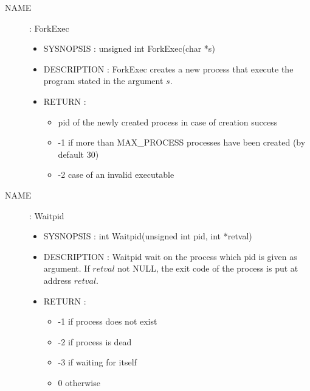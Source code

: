 \documentclass[a4paper,10pt]{article}
\begin{document}
\begin{description}
    \item [NAME] : ForkExec
        \begin{itemize}
            \item SYSNOPSIS : unsigned int ForkExec(char *s)
            \item DESCRIPTION :
                ForkExec creates a new process that execute the program stated in the argument $s$.
            \item RETURN :
                \begin{itemize}
                    \item pid of the newly created process in case of creation success
                    \item -1 if more than MAX\_PROCESS processes have been created (by default 30)
                    \item -2 case of an invalid executable
                \end{itemize}
        \end{itemize}

    \item [NAME] : Waitpid
        \begin{itemize}
            \item SYSNOPSIS : int Waitpid(unsigned int pid, int *retval)
            \item DESCRIPTION :
                Waitpid wait on the process which pid is given as argument.
                If $retval$ not NULL, the exit code of the process is put at address $retval$.
            \item RETURN :
                \begin{itemize}
                    \item -1 if process does not exist
                    \item -2 if process is dead
                    \item -3 if waiting for itself
                    \item 0 otherwise
                \end{itemize}
        \end{itemize}


\end{description}
\end{document}
